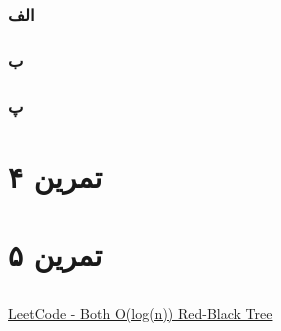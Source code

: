 \documentclass[]{article}
\begin{document}
\subsubsection*{الف}

\subsubsection*{ب}

\subsubsection*{پ}


\subsection*{\color{red}{مراجع}}
\begin{latin}
\end{latin}
\pagebreak

\section*{تمرین ۴}

\subsection*{\color{blue}{جواب}}

\subsection*{\color{red}{مراجع}}
\pagebreak
\restoregeometry

\section*{تمرین ۵}

\subsection*{\color{blue}{جواب}}


\subsection*{\color{red}{مراجع}}
\begin{latin}
    \href{https://leetcode.com/problems/find-median-from-data-stream/solutions/74134/both-ologn-red-black-tree-solution-in-python/}{LeetCode - Both O(log(n)) Red-Black Tree}
\end{latin}
\restoregeometry
\end{document}
